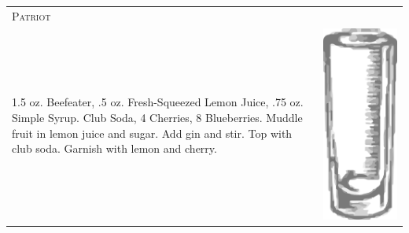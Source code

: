 \documentclass{article}
\begin{document}
\begin{tabular}{p{2in} p{0.5in}}
\multicolumn{2}{p{3in}}{\centering\Huge\textsc{Patriot}} \\ 
   \vspace{-0.1in}1.5 oz. Beefeater, .5 oz. Fresh-Squeezed Lemon Juice, .75 oz. Simple Syrup. Club Soda, 4 Cherries, 8 Blueberries. Muddle fruit in lemon juice and sugar. Add gin and stir. Top with club soda. Garnish with lemon and cherry. &
   \vspace{-0.1in} \includegraphics{collins.png}
\end{tabular}
\end{document}
